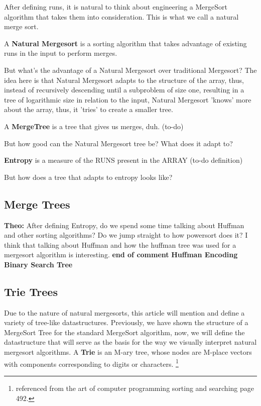 \documentclass[a4paper]{article}
\theoremstyle{plain}
\theoremstyle{definition}
\begin{document}
\noindent \newline After defining runs, it is natural to think about engineering a MergeSort algorithm 
that takes them into consideration. This is what we call a natural merge sort.

 A \textbf{Natural Mergesort} is a sorting algorithm that takes advantage of
existing runs in the input to perform merges. 

\noindent \newline But what's the advantage of a Natural Mergesort over traditional Mergesort? The idea here is that
Natural Mergesort adapts to the structure of the array, thus, instead of recursively descending 
until a subproblem of size one, resulting in a tree of logarithmic size in relation to the input, Natural Mergesort
'knows' more about the array, thus, it 'tries' to create a smaller tree. 

 A \textbf{MergeTree} is a tree that gives us merges, duh. (to-do)

\noindent \newline But how good can the Natural Mergesort tree be? What does it adapt to? 

 \textbf{Entropy} is a measure of the RUNS present in the ARRAY (to-do definition)

\noindent \newline But how does a tree that adapts to entropy looks like?

\subsection{Merge Trees}
\textbf{Theo:} After defining Entropy, do we spend some time talking about Huffman
and other sorting algorithms? Do we jump straight to how powersort does it?
I think that talking about Huffman and how the huffman tree was used for 
a mergesort algorithm is interesting. 
\newline \textbf{end of comment}
 \textbf{Huffman Encoding}
 \textbf{Binary Search Tree}

\subsection{Trie Trees}
Due to the nature of natural mergesorts, this article will mention and define a variety of tree-like datastructures. Previously,
we have shown the structure of a MergeSort Tree for the standard MergeSort algorithm, now, we will define the
datastructure that will serve as the basis for the way we visually interpret natural mergesort algorithms. 
 A \textbf{Trie} is an M-ary tree, whose nodes are M-place vectors with components corresponding to digits or characters.
\footnote{referenced from the art of computer programming sorting and searching page 492.}
\end{document}

